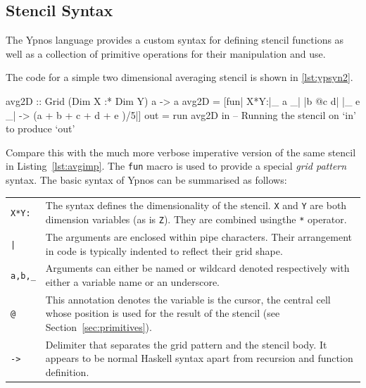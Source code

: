\documentclass[
    12pt,
    a4paper,
    twoside,
    openright,
    ]{scrbook}
\begin{document}
\subsection{Stencil Syntax}

The Ypnos language provides a custom syntax for defining stencil functions as
well as a collection of primitive operations for their manipulation and use.

The code for a simple two dimensional averaging stencil is shown in
\autoref{lst:ypsyn2}.

\begin{hlisting}[label={lst:ypsyn2},caption={The simple mean function from \autoref{lst:ypsyn1}}]
avg2D :: Grid (Dim X :* Dim Y) a -> a
avg2D = [fun| X*Y:|_  a _|
                  |b @c d|
                  |_  e _| -> (a + b + c + d + e )/5|]
out = run avg2D in -- Running the stencil on `in' to produce `out'
\end{hlisting}

Compare this with the much more verbose imperative version of the same stencil
in Listing~\ref{lst:avgimp}.  The \texttt{fun} macro is used to provide a
special \emph{grid pattern} syntax. The basic syntax of Ypnos can be summarised
as follows:

\begin{tabular}{p{} p{}}

  \texttt{X*Y:} & The syntax defines the dimensionality of the
  stencil. \texttt{X} and \texttt{Y} are both dimension variables (as is
  \texttt{Z}). They are combined usingthe \texttt{*} operator.  \\

\texttt{|} & The arguments are enclosed within pipe characters.  Their
arrangement in code is typically indented to reflect their grid shape.  \\

\texttt{a,b,\_} & Arguments can either be named or wildcard denoted
respectively with either a variable name or an underscore.  \\

\texttt{@} & This annotation denotes the variable is the cursor, the central cell whose position is used for the
result of the stencil (see Section~\ref{sec:primitives}).  \\

\texttt{->} & Delimiter that separates the grid pattern and the stencil body. It
appears to be normal Haskell syntax apart from recursion and function
definition.
\\

\end{tabular}
\end{document}
